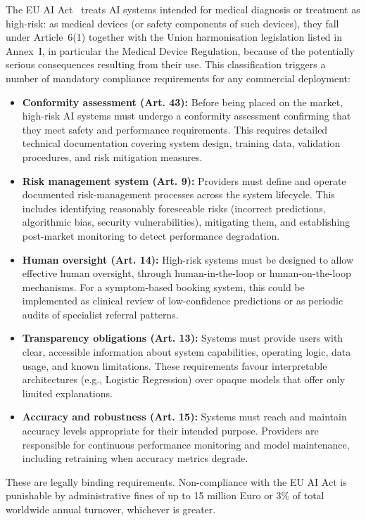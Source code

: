 The EU AI Act~\citep{EUAI2024} treats AI systems intended for medical diagnosis or treatment as high-risk: as medical devices (or safety components of such devices), they fall under Article~6(1) together with the Union harmonisation legislation listed in Annex~I, in particular the Medical Device Regulation, because of the potentially serious consequences resulting from their use. This classification triggers a number of mandatory compliance requirements for any commercial deployment:

\begin{itemize}
    \item \textbf{Conformity assessment (Art. 43):} Before being placed on the market, high-risk AI systems must undergo a conformity assessment confirming that they meet safety and performance requirements. This requires detailed technical documentation covering system design, training data, validation procedures, and risk mitigation measures.
    \item \textbf{Risk management system (Art. 9):} Providers must define and operate documented risk-management processes across the system lifecycle. This includes identifying reasonably foreseeable risks (incorrect predictions, algorithmic bias, security vulnerabilities), mitigating them, and establishing post-market monitoring to detect performance degradation.
    \item \textbf{Human oversight (Art. 14):} High-risk systems must be designed to allow effective human oversight, through human-in-the-loop or human-on-the-loop mechanisms. For a symptom-based booking system, this could be implemented as clinical review of low-confidence predictions or as periodic audits of specialist referral patterns.
    \item \textbf{Transparency obligations (Art. 13):} Systems must provide users with clear, accessible information about system capabilities, operating logic, data usage, and known limitations. These requirements favour interpretable architectures (e.g., Logistic Regression) over opaque models that offer only limited explanations.
    \item \textbf{Accuracy and robustness (Art. 15):} Systems must reach and maintain accuracy levels appropriate for their intended purpose. Providers are responsible for continuous performance monitoring and model maintenance, including retraining when accuracy metrics degrade.
\end{itemize}

These are legally binding requirements. Non-compliance with the EU AI Act is punishable by administrative fines of up to 15 million Euro or 3\% of total worldwide annual turnover, whichever is greater.

